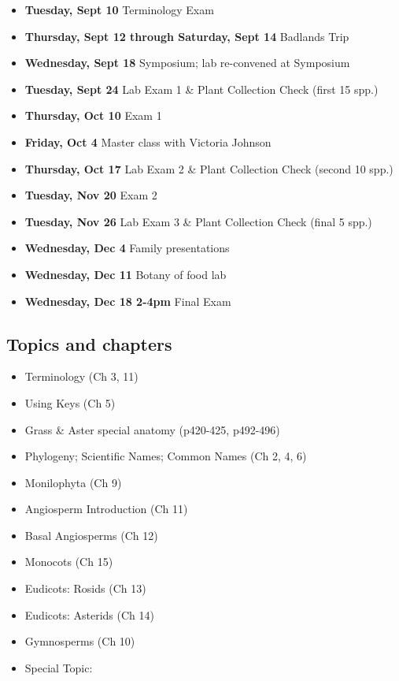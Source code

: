 \documentclass{tufte-handout}
\begin{document}
\begin{fullwidth}
\begin{itemize}
	\item \textbf{Tuesday, Sept 10} Terminology Exam
	\item \textbf{Thursday, Sept 12 through Saturday, Sept 14} Badlands Trip
	\item \textbf{Wednesday, Sept 18} Symposium; lab re-convened at Symposium
	\item \textbf{Tuesday, Sept 24} Lab Exam 1 \& Plant Collection Check (first 15 spp.)
	\item \textbf{Thursday, Oct 10} Exam 1
	\item \textbf{Friday, Oct 4} Master class with Victoria Johnson
	\item \textbf{Thursday, Oct 17} Lab Exam 2 \& Plant Collection Check (second 10 spp.)
	\item \textbf{Tuesday, Nov 20} Exam 2
	\item \textbf{Tuesday, Nov 26} Lab Exam 3 \& Plant Collection Check (final 5 spp.)
	\item \textbf{Wednesday, Dec 4} Family presentations
	\item \textbf{Wednesday, Dec 11} Botany of food lab
	\item \textbf{Wednesday, Dec 18 2-4pm} Final Exam
\end{itemize}

\subsection{Topics and chapters}

\begin{itemize}
	\item Terminology (Ch 3, 11)
	\item Using Keys (Ch 5)
	\item Grass \& Aster special anatomy (p420-425, p492-496)
	\item Phylogeny; Scientific Names; Common Names (Ch 2, 4, 6)
	\item Monilophyta (Ch 9)
	\item Angiosperm Introduction (Ch 11)
	\item Basal Angiosperms (Ch 12)
	\item Monocots (Ch 15)
	\item Eudicots: Rosids (Ch 13)
	\item Eudicots: Asterids (Ch 14)
	\item Gymnosperms (Ch 10)
	\item Special Topic: 
\end{itemize}


\end{fullwidth}
\end{document}
